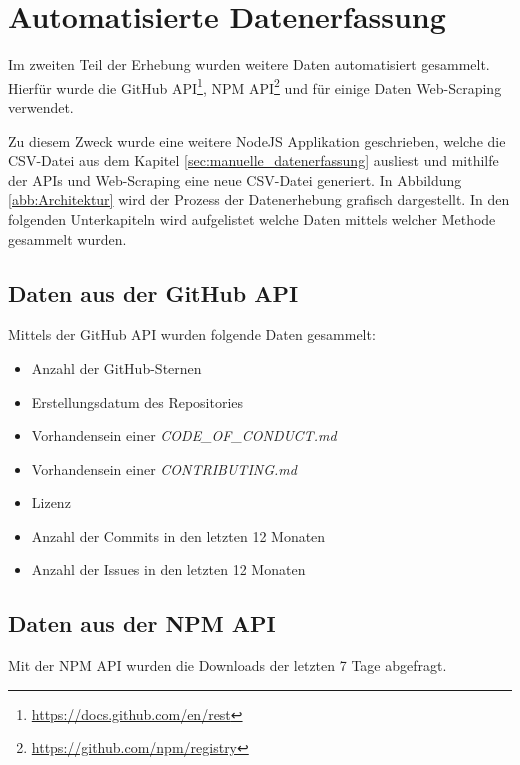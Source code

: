 \section{Automatisierte Datenerfassung}\label{sec:automatisierte_datenerfassung}

Im zweiten Teil der Erhebung wurden weitere Daten automatisiert gesammelt. Hierfür wurde die
GitHub API\footnote{\url{https://docs.github.com/en/rest}}, NPM
API\footnote{\url{https://github.com/npm/registry}} und für einige Daten Web-Scraping
verwendet.

Zu diesem Zweck wurde eine weitere NodeJS Applikation geschrieben, welche die CSV-Datei aus dem
Kapitel \ref{sec:manuelle_datenerfassung} ausliest und mithilfe der APIs und Web-Scraping eine neue
CSV-Datei generiert. In Abbildung \ref{abb:Architektur} wird der Prozess der Datenerhebung grafisch
dargestellt. In den folgenden Unterkapiteln wird aufgelistet welche Daten mittels welcher Methode gesammelt wurden.


\subsection{Daten aus der GitHub API}
Mittels der GitHub API wurden folgende Daten gesammelt:

\begin{itemize}[noitemsep]
    \item Anzahl der GitHub-Sternen
    \item Erstellungsdatum des Repositories
    \item Vorhandensein einer \textit{CODE\_OF\_CONDUCT.md}
    \item Vorhandensein einer \textit{CONTRIBUTING.md}
    \item Lizenz
    \item Anzahl der Commits in den letzten 12 Monaten
    \item Anzahl der Issues in den letzten 12 Monaten
\end{itemize}


\subsection{Daten aus der NPM API}
Mit der NPM API wurden die Downloads der letzten 7 Tage abgefragt.

